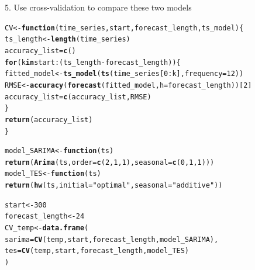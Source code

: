 \documentclass[10pt]{article}\usepackage[]{graphicx}\usepackage[]{color}
\makeatletter
\newcommand{\hlnum}[1]{\textcolor[rgb]{0.686,0.059,0.569}{#1}}%
\newcommand{\hlstr}[1]{\textcolor[rgb]{0.192,0.494,0.8}{#1}}%
\newcommand{\hlopt}[1]{\textcolor[rgb]{0,0,0}{#1}}%
\newcommand{\hlstd}[1]{\textcolor[rgb]{0.345,0.345,0.345}{#1}}%
\newcommand{\hlkwa}[1]{\textcolor[rgb]{0.161,0.373,0.58}{\textbf{#1}}}%
\newcommand{\hlkwb}[1]{\textcolor[rgb]{0.69,0.353,0.396}{#1}}%
\newcommand{\hlkwc}[1]{\textcolor[rgb]{0.333,0.667,0.333}{#1}}%
\newcommand{\hlkwd}[1]{\textcolor[rgb]{0.737,0.353,0.396}{\textbf{#1}}}%
\newenvironment{kframe}{%
 \def\at@end@of@kframe{}%
 \ifinner\ifhmode%
  \def\at@end@of@kframe{\end{minipage}}%
  \begin{minipage}{\columnwidth}%
 \fi\fi%
 \def\FrameCommand##1{\hskip\@totalleftmargin \hskip-\fboxsep
 \colorbox{shadecolor}{##1}\hskip-\fboxsep
     \hskip-\linewidth \hskip-\@totalleftmargin \hskip\columnwidth}%
 \MakeFramed {\advance\hsize-\width
   \@totalleftmargin\z@ \linewidth\hsize
   \@setminipage}}%
 {\par\unskip\endMakeFramed%
 \at@end@of@kframe}
\newenvironment{knitrout}{}{} %
\makeatother
\begin{document}
5. Use cross-validation to compare these two models
\begin{knitrout}
\color{fgcolor}\begin{kframe}
\begin{alltt}
\hlstd{CV} \hlkwb{<-}  \hlkwa{function}\hlstd{(}\hlkwc{time_series}\hlstd{,} \hlkwc{start}\hlstd{,} \hlkwc{forecast_length}\hlstd{,}\hlkwc{ts_model}\hlstd{)\{}
  \hlstd{ts_length} \hlkwb{<-}  \hlkwd{length}\hlstd{(time_series)}
  \hlstd{accuracy_list} \hlkwb{=} \hlkwd{c}\hlstd{()}
  \hlkwa{for}\hlstd{(k} \hlkwa{in} \hlstd{start}\hlopt{:}\hlstd{(ts_length} \hlopt{-} \hlstd{forecast_length))\{}
    \hlstd{fitted_model} \hlkwb{<-} \hlkwd{ts_model}\hlstd{(}\hlkwd{ts}\hlstd{(time_series[}\hlnum{0}\hlopt{:}\hlstd{k],}\hlkwc{frequency} \hlstd{=} \hlnum{12}\hlstd{))}
    \hlstd{RMSE} \hlkwb{<-}  \hlkwd{accuracy}\hlstd{(}\hlkwd{forecast}\hlstd{(fitted_model,} \hlkwc{h} \hlstd{= forecast_length))[}\hlnum{2}\hlstd{]}
    \hlstd{accuracy_list} \hlkwb{=} \hlkwd{c}\hlstd{(accuracy_list, RMSE)}
  \hlstd{\}}
  \hlkwd{return}\hlstd{(accuracy_list)}
\hlstd{\}}

\hlstd{model_SARIMA} \hlkwb{<-} \hlkwa{function}\hlstd{(}\hlkwc{ts}\hlstd{)}
  \hlkwd{return}\hlstd{(}\hlkwd{Arima}\hlstd{(ts,} \hlkwc{order} \hlstd{=} \hlkwd{c}\hlstd{(}\hlnum{2}\hlstd{,}\hlnum{1}\hlstd{,}\hlnum{1}\hlstd{),} \hlkwc{seasonal} \hlstd{=} \hlkwd{c}\hlstd{(}\hlnum{0}\hlstd{,}\hlnum{1}\hlstd{,}\hlnum{1}\hlstd{)))}
\hlstd{model_TES} \hlkwb{<-} \hlkwa{function}\hlstd{(}\hlkwc{ts}\hlstd{)}
  \hlkwd{return}\hlstd{(}\hlkwd{hw}\hlstd{(ts,}\hlkwc{initial} \hlstd{=} \hlstr{"optimal"}\hlstd{,} \hlkwc{seasonal} \hlstd{=} \hlstr{"additive"}\hlstd{))}

\hlstd{start} \hlkwb{<-} \hlnum{300}
\hlstd{forecast_length} \hlkwb{<-} \hlnum{24}
\hlstd{CV_temp} \hlkwb{<-} \hlkwd{data.frame}\hlstd{(}
  \hlkwc{sarima} \hlstd{=} \hlkwd{CV}\hlstd{(temp, start, forecast_length, model_SARIMA),}
  \hlkwc{tes} \hlstd{=} \hlkwd{CV}\hlstd{(temp, start, forecast_length, model_TES)}
\hlstd{)}


\end{alltt}
\end{kframe}
\end{knitrout}
\end{document}
